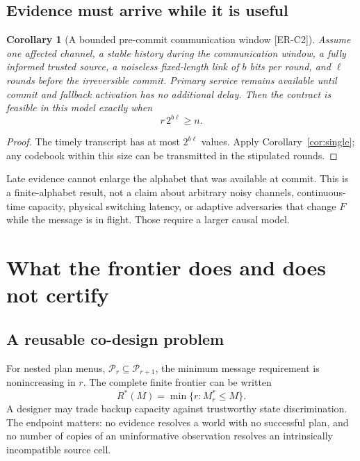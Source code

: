 \documentclass[11pt,a4paper]{article}
\newtheorem{corollary}[theorem]{Corollary}
\theoremstyle{definition}\newtheorem{definition}{Definition}
\newcommand{\idtag}[1]{\textnormal{\textsf{[#1]}}}
\newcommand{\Plans}{\mathcal P}
\begin{document}
\subsection{Evidence must arrive while it is useful}
\begin{corollary}[A bounded pre-commit communication window \idtag{ER-C2}]
\label{cor:time}
Assume one affected channel, a stable history during the communication window, a fully informed trusted source, a noiseless fixed-length link of $b$ bits per round, and $\ell$ rounds before the irreversible commit. Primary service remains available until commit and fallback activation has no additional delay. Then the contract is feasible in this model exactly when
\begin{equation}
\boxed{r\,2^{b\ell}\geq n.}
\end{equation}
\end{corollary}
\begin{proof}
The timely transcript has at most $2^{b\ell}$ values. Apply Corollary~\ref{cor:single}; any codebook within this size can be transmitted in the stipulated rounds.
\end{proof}
Late evidence cannot enlarge the alphabet that was available at commit. This is a finite-alphabet result, not a claim about arbitrary noisy channels, continuous-time capacity, physical switching latency, or adaptive adversaries that change $F$ while the message is in flight. Those require a larger causal model.

\section{What the frontier does and does not certify}
\label{sec:certificate}
\subsection{A reusable co-design problem}
For nested plan menus, $\Plans_r\subseteq\Plans_{r+1}$, the minimum message requirement is nonincreasing in $r$. The complete finite frontier can be written
\begin{equation}
R^*(M)=\min\{r:M_r^*\leq M\}.
\end{equation}
A designer may trade backup capacity against trustworthy state discrimination. The endpoint matters: no evidence resolves a world with no successful plan, and no number of copies of an uninformative observation resolves an intrinsically incompatible source cell.
\end{document}
